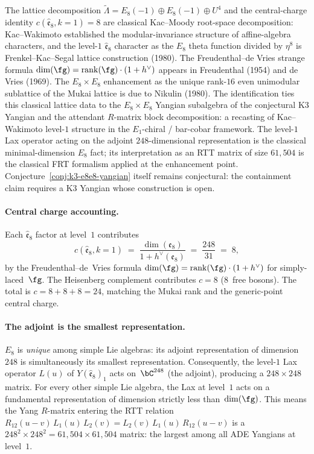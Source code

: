 \begin{remark}
\label{rem:k3-e8e8-classical}
The lattice decomposition $\widetilde{\Lambda} = E_8(-1) \oplus E_8(-1)
\oplus U^4$ and the central-charge identity
$c(\widehat{\mathfrak{e}}_8, k=1) = 8$ are classical Kac--Moody
root-space decomposition: Kac--Wakimoto \cite{KacWakimoto1988} established
the modular-invariance structure of affine-algebra characters, and the
level-$1$ $\widehat{\mathfrak{e}}_8$ character as the $E_8$ theta function
divided by $\eta^8$ is Frenkel--Kac--Segal lattice construction (1980).
The Freudenthal--de Vries strange formula
$\dim(\fg) = \mathrm{rank}(\fg) \cdot (1 + h^\vee)$ appears in
Freudenthal (1954) and de Vries (1969). The $E_8 \times E_8$
enhancement as the unique rank-$16$ even unimodular sublattice
of the Mukai lattice is due to Nikulin (1980). The identification ties
this classical lattice data to the $E_8 \times E_8$ Yangian subalgebra
of the conjectural K3 Yangian and the attendant $R$-matrix block
decomposition: a recasting of Kac--Wakimoto level-$1$ structure in the
$E_1$-chiral / bar-cobar framework. The level-$1$ Lax operator acting on the adjoint
$248$-dimensional representation is the classical minimal-dimension
$E_8$ fact; its interpretation as an RTT matrix of size $61{,}504$ is
the classical FRT formalism applied at the enhancement point.
Conjecture~\ref{conj:k3-e8e8-yangian} itself remains conjectural: the
containment claim requires a K3 Yangian whose construction is open.
\end{remark}

\paragraph{Central charge accounting.}
Each $\widehat{\mathfrak{e}}_8$ factor at level~$1$ contributes
\[
 c(\widehat{\mathfrak{e}}_8, k\!=\!1)
 \;=\;
 \frac{\dim(\mathfrak{e}_8)}{1 + h^\vee(\mathfrak{e}_8)}
 \;=\;
 \frac{248}{31}
 \;=\; 8,
\]
by the Freudenthal--de~Vries formula $\dim(\fg) = \mathrm{rank}(\fg) \cdot (1 + h^\vee)$ for simply-laced~$\fg$. The Heisenberg complement contributes $c = 8$ ($8$~free bosons). The total is $c = 8 + 8 + 8 = 24$, matching the Mukai rank and the generic-point central charge.

\paragraph{The adjoint is the smallest representation.}
$E_8$ is \emph{unique} among simple Lie algebras: its adjoint representation of dimension~$248$ is simultaneously its smallest representation. Consequently, the level-$1$ Lax operator $L(u)$ of $Y(\widehat{\mathfrak{e}}_8)_1$ acts on~$\bC^{248}$ (the adjoint), producing a $248 \times 248$ matrix. For every other simple Lie algebra, the Lax at level~$1$ acts on a fundamental representation of dimension strictly less than~$\dim(\fg)$. This means the Yang $R$-matrix entering the RTT relation $R_{12}(u-v)\,L_1(u)\,L_2(v) = L_2(v)\,L_1(u)\,R_{12}(u-v)$ is a $248^2 \times 248^2 = 61{,}504 \times 61{,}504$ matrix: the largest among all ADE Yangians at level~$1$.

